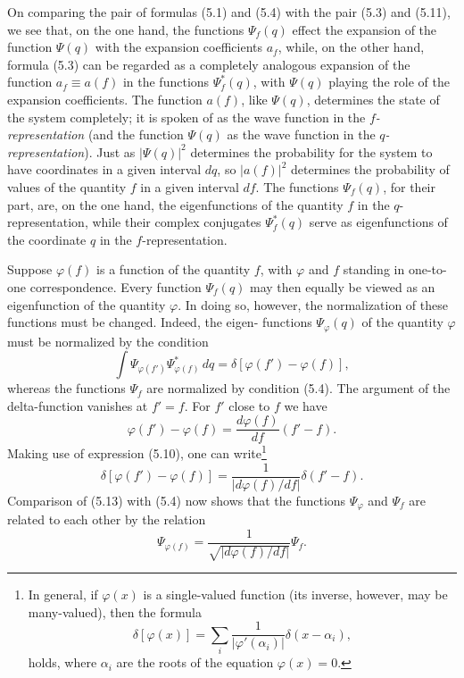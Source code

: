 On comparing the pair of formulas (5.1) and (5.4) with the pair (5.3) and
(5.11), we see that, on the one hand, the functions $\Psi_f(q)$ effect the
expansion of the function $\Psi(q)$ with the expansion coefficients $a_f$, while,
on the other hand, formula (5.3) can be regarded as a completely analogous
expansion of the function $a_f\equiv a(f)$ in the functions $\Psi_f^*(q)$, with
$\Psi(q)$ playing the role of the expansion coefficients. The function $a(f)$,
like $\Psi(q)$, determines the state of the system completely; it is spoken of
as the wave function in the \textit{$f$-representation} (and the function
$\Psi(q)$ as the wave function in the \textit{$q$-representation}). Just as
$|\Psi(q)|^2$ determines the probability for the system to have coordinates in
a given interval $dq$, so $|a(f)|^2$ determines the probability of values of
the quantity $f$ in a given interval $df$. The functions $\Psi_f(q)$, for their
part, are, on the one hand, the eigenfunctions of the quantity $f$ in the
$q$-representation, while their complex conjugates $\Psi_f^*(q)$ serve as
eigenfunctions of the coordinate $q$ in the $f$-representation.

Suppose $\varphi(f)$ is a function of the quantity $f$, with $\varphi$ and
$f$ standing in one-to-one correspondence. Every function $\Psi_f(q)$ may then
equally be viewed as an eigenfunction of the quantity
$\varphi$. In doing so, however, the normalization of these functions must be
changed. Indeed, the eigen-
functions $\Psi_\varphi(q)$ of the quantity $\varphi$ must be normalized by the
condition
\[
  \int\Psi_{\varphi(f')}\Psi_{\varphi(f)}^*\,dq
  =\delta[\varphi(f')-\varphi(f)],
\]
whereas the functions $\Psi_f$ are normalized by condition (5.4). The argument
of the delta-function vanishes at $f'=f$. For $f'$ close to $f$ we have
\[
  \varphi(f')-\varphi(f)=\frac{d\varphi(f)}{df}(f'-f).
\]
Making use of expression (5.10), one can write\footnote{In general, if
$\varphi(x)$ is a single-valued function (its inverse, however, may be
many-valued), then the formula
\begin{equation}
  \delta[\varphi(x)]
  =\sum_i\frac{1}{|\varphi'(\alpha_i)|}\delta(x-\alpha_i),
  \tag{5.13a}
\end{equation}
holds, where $\alpha_i$ are the roots of the equation $\varphi(x)=0$.}
\begin{equation}
  \delta[\varphi(f')-\varphi(f)]
  =\frac{1}{|d\varphi(f)/df|}\delta(f'-f).
  \tag{5.13}
\end{equation}
Comparison of (5.13) with (5.4) now shows that the functions $\Psi_\varphi$ and
$\Psi_f$ are related to each other by the relation
\begin{equation}
  \Psi_{\varphi(f)}
  =\frac{1}{\sqrt{|d\varphi(f)/df|}}\Psi_f.
  \tag{5.14}
\end{equation}

